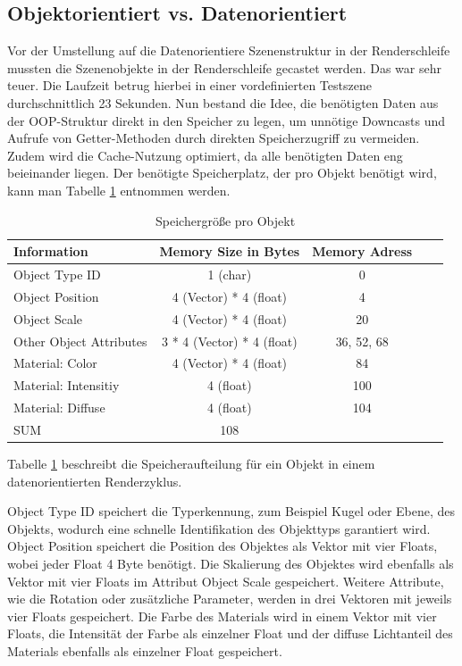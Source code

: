 \documentclass[sigconf]{acmart}
\begin{document}
\subsection{Objektorientiert vs. Datenorientiert} \label{OOP_DO}
Vor der Umstellung auf die Datenorientiere Szenenstruktur in der Renderschleife mussten die Szenenobjekte in der Renderschleife gecastet werden. Das war sehr teuer.
Die Laufzeit betrug hierbei in einer vordefinierten Testszene durchschnittlich 23 Sekunden.
Nun bestand die Idee, die benötigten Daten aus der OOP-Struktur direkt in den Speicher zu legen, um unnötige Downcasts und Aufrufe von Getter-Methoden durch direkten Speicherzugriff zu vermeiden. Zudem wird die Cache-Nutzung optimiert, da alle benötigten Daten eng beieinander liegen.
Der benötigte Speicherplatz, der pro Objekt benötigt wird, kann man Tabelle \ref{SpeichergrößeObjekt} entnommen werden.

\begin{table}[b]
 \caption{Speichergröße pro Objekt}

 \label{SpeichergrößeObjekt}
 \centering
 \small
 \begin{tabular}[h]{lcccr}
  \toprule
  Information & Memory Size in Bytes & Memory Adress\\
  \midrule
  Object Type ID & 1 (char) & 0\\
  Object Position & 4 (Vector) * 4 (float) & 4\\
  Object Scale & 4 (Vector) * 4 (float) & 20\\
  Other Object Attributes & 3 * 4 (Vector) * 4 (float) & 36, 52, 68\\
  Material: Color & 4 (Vector) * 4 (float) & 84\\
  Material: Intensitiy & 4 (float) & 100\\
  Material: Diffuse & 4 (float) & 104\\
  \midrule
  SUM & 108\\
  \bottomrule
 \end{tabular}
\end{table}

Tabelle \ref{SpeichergrößeObjekt} beschreibt die Speicheraufteilung für ein Objekt in einem datenorientierten Renderzyklus. 

Object Type ID speichert die Typerkennung, zum Beispiel Kugel oder Ebene, des Objekts, wodurch eine schnelle Identifikation des Objekttyps garantiert wird.
Object Position speichert die Position des Objektes als Vektor mit vier Floats, wobei jeder Float 4 Byte benötigt.
Die Skalierung des Objektes wird ebenfalls als Vektor mit vier Floats im Attribut Object Scale gespeichert.
Weitere Attribute, wie die Rotation oder zusätzliche Parameter, werden in drei Vektoren mit jeweils vier Floats gespeichert.
Die Farbe des Materials wird in einem Vektor mit vier Floats, die Intensität der Farbe als einzelner Float und der diffuse Lichtanteil des Materials ebenfalls als einzelner Float gespeichert.
\end{document}
